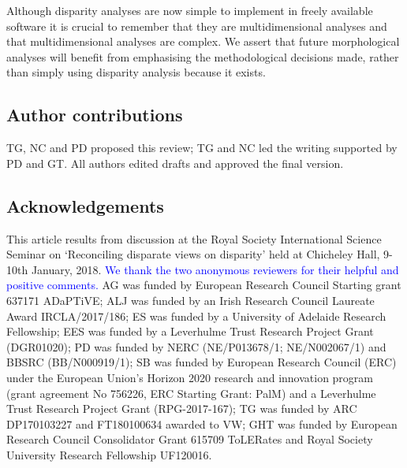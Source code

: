\documentclass[12pt,letterpaper]{article}
\begin{document}
Although disparity analyses are now simple to implement in freely available software \citep{Bouxin2005, oksanen2007vegan, Harmon2008, lloyd2016, Guillerme2018b} it is crucial to remember that they are multidimensional analyses and that multidimensional analyses are complex.
We assert that future morphological analyses will benefit from emphasising the methodological decisions made, rather than simply using disparity analysis because it exists.

\subsection{Author contributions}

TG, NC and PD proposed this review; TG and NC led the writing supported by PD and GT.
All authors edited drafts and approved the final version.

\subsection{Acknowledgements}

This article results from discussion at the Royal Society International Science Seminar on `Reconciling disparate views on disparity' held at Chicheley Hall, 9-10th January, 2018.
\textcolor{blue}{We thank the two anonymous reviewers for their helpful and positive comments.}
AG was funded by European Research Council Starting grant 637171 ADaPTiVE;
ALJ was funded by an Irish Research Council Laureate Award IRCLA/2017/186;
ES was funded by a University of Adelaide Research Fellowship;
EES was funded by a Leverhulme Trust Research Project Grant (DGR01020);
PD was funded by NERC (NE/P013678/1; NE/N002067/1) and BBSRC (BB/N000919/1);
SB was funded by European Research Council (ERC) under the European Union's Horizon 2020 research and innovation program (grant agreement No 756226, ERC Starting Grant: PalM) and a Leverhulme Trust Research Project Grant (RPG-2017-167);
TG was funded by ARC DP170103227 and FT180100634 awarded to VW;
GHT was funded by European Research Council Consolidator Grant 615709 ToLERates and Royal Society University Research Fellowship UF120016.



\end{document}
